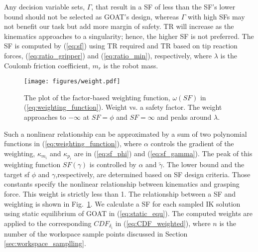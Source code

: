 \documentclass[letterpaper, 10 pt, conference]{ieeeconf}  %
\newcommand{\fig}[1]{Fig.~\ref{#1}}
\newcommand{\eq}[1]{(\ref{#1})}
\begin{document}
Any decision variable sets, $\Gamma$, that result in a SF of less than the SF's lower bound should not be selected as GOAT's design, whereas $\Gamma$ with high SFs may not benefit our task but add more margin of safety.
TR will increase as the kinematics approaches to a singularity; hence, the higher SF is not preferred. 
The SF is computed by \eq{eq:sf} using TR required and TR based on tip reaction forces, \eq{eq:ratio_gripper} and \eq{eq:ratio_min}, respectively, where $\lambda$ is the Coulomb friction coefficient, $m_r$ is the robot mass. 




 \begin{figure}
    \centering
\texttt{[image: figures/weight.pdf]}
     \caption{The plot of the factor-based weighting function, $\omega(SF)$ in \eq{eq:weighting_function}. Weight vs. a safety factor. The weight approaches to $-\infty$ at $SF=\phi$ and $SF=\infty$ and peaks around $\lambda$. \label{fig:weight}}
\end{figure} 

Such a nonlinear relationship can be approximated by a sum of two polynomial functions in \eq{eq:weighting_function}, where $\alpha$ controls the gradient of the weighting, $\kappa_{m_i}$ and $\kappa_{p_i}$ are in \eq{eq:sf_phi} and \eq{eq:sf_gamma}. The peak of this weighting function $SF(\gamma)$ is controlled by $\alpha$ and $\tilde{\gamma}$. The lower bound and the target sf $\phi$ and $\gamma$,respectively, are determined based on SF design criteria. 
Those constants specify the nonlinear relationship between kinematics and grasping force. 
This weight is strictly less than 1. The relationship between a SF and weighting is shown in \fig{fig:weight}.
We calculate a SF for each sampled IK solution using static equilibrium of GOAT in \eq{eq:static_equ}. 
The computed weights are applied to the corresponding $CDF_{\delta_i}$ in \eq{eq:CDF_weighted}, where $n$ is the number of the workspace sample points discussed in Section \ref{sec:workspace_samplling}. 
\end{document}
